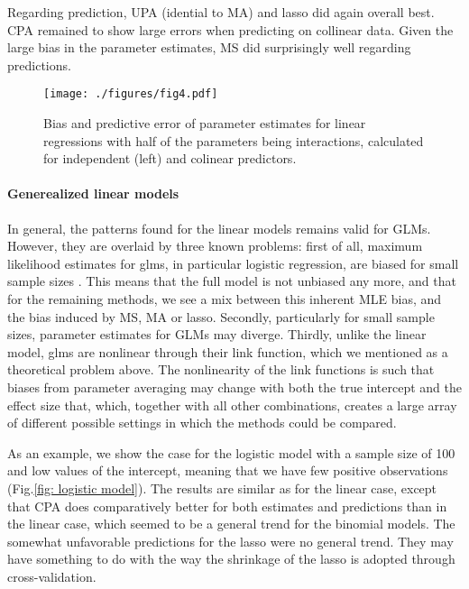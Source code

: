\documentclass[5p]{elsarticle}
\begin{document}
Regarding prediction, UPA (idential to MA) and lasso did again overall best. CPA remained to show large errors when predicting on collinear data. Given the large bias in the parameter estimates, MS did surprisingly well regarding predictions.  

\begin{figure*}\label{fig: linear interactions}
\texttt{[image: ./figures/fig4.pdf]}
\caption{Bias and predictive error of parameter estimates for linear regressions with half of the parameters being interactions, calculated for independent (left) and colinear predictors.}
\end{figure*}


\paragraph{Generealized linear models} 

In general, the patterns found for the linear models remains valid for GLMs. However, they are overlaid by three known problems: first of all, maximum likelihood estimates for glms, in particular logistic regression, are biased for small sample sizes \citep{Cordeiro-BiasCorrectionin-1991, Wisz-Effectssamplesize-2008}. This means that the full model is not unbiased any more, and that for the remaining methods, we see a mix between this inherent MLE bias, and the bias induced by MS, MA or lasso. Secondly, particularly for small sample sizes, parameter estimates for GLMs may diverge. Thirdly, unlike the linear model, glms are nonlinear through their link function, which we mentioned as a theoretical problem above. The nonlinearity of the link functions is such that biases from parameter averaging may change with both the true intercept and the effect size that, which, together with all other combinations, creates a large array of different possible settings in which the methods could be compared. 

As an example, we show the case for the logistic model with a sample size of 100 and low values of the intercept, meaning that we have few positive observations (Fig.\ref{fig: logistic model}). The results are similar as for the linear case, except that CPA does comparatively better for both estimates and predictions than in the linear case, which seemed to be a general trend for the binomial models. The somewhat unfavorable predictions for the lasso were no general trend. They may have something to do with the way the shrinkage of the lasso is adopted through cross-validation. 
\end{document}

